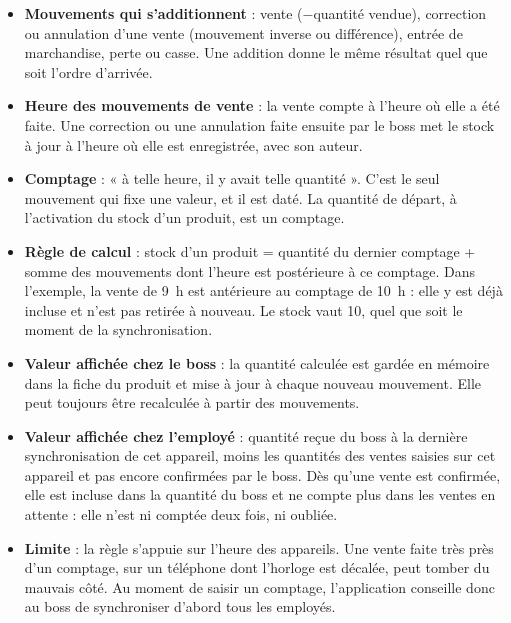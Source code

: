 \documentclass[11pt,a4paper]{article}
\begin{document}
	\begin{itemize}[leftmargin=*]
		\item \textbf{Mouvements qui s'additionnent} : vente ($-$quantité vendue), correction ou annulation d'une vente (mouvement inverse ou différence), entrée de marchandise, perte ou casse. Une addition donne le même résultat quel que soit l'ordre d'arrivée.
		\item \textbf{Heure des mouvements de vente} : la vente compte à l'heure où elle a été faite. Une correction ou une annulation faite ensuite par le boss met le stock à jour à l'heure où elle est enregistrée, avec son auteur.
		\item \textbf{Comptage} : « à telle heure, il y avait telle quantité ». C'est le seul mouvement qui fixe une valeur, et il est daté. La quantité de départ, à l'activation du stock d'un produit, est un comptage.
		\item \textbf{Règle de calcul} : stock d'un produit = quantité du dernier comptage + somme des mouvements dont l'heure est postérieure à ce comptage. Dans l'exemple, la vente de 9~h est antérieure au comptage de 10~h : elle y est déjà incluse et n'est pas retirée à nouveau. Le stock vaut 10, quel que soit le moment de la synchronisation.
		\item \textbf{Valeur affichée chez le boss} : la quantité calculée est gardée en mémoire dans la fiche du produit et mise à jour à chaque nouveau mouvement. Elle peut toujours être recalculée à partir des mouvements.
		\item \textbf{Valeur affichée chez l'employé} : quantité reçue du boss à la dernière synchronisation de cet appareil, moins les quantités des ventes saisies sur cet appareil et pas encore confirmées par le boss. Dès qu'une vente est confirmée, elle est incluse dans la quantité du boss et ne compte plus dans les ventes en attente : elle n'est ni comptée deux fois, ni oubliée.
		\item \textbf{Limite} : la règle s'appuie sur l'heure des appareils. Une vente faite très près d'un comptage, sur un téléphone dont l'horloge est décalée, peut tomber du mauvais côté. Au moment de saisir un comptage, l'application conseille donc au boss de synchroniser d'abord tous les employés.
	\end{itemize}

\end{document}
